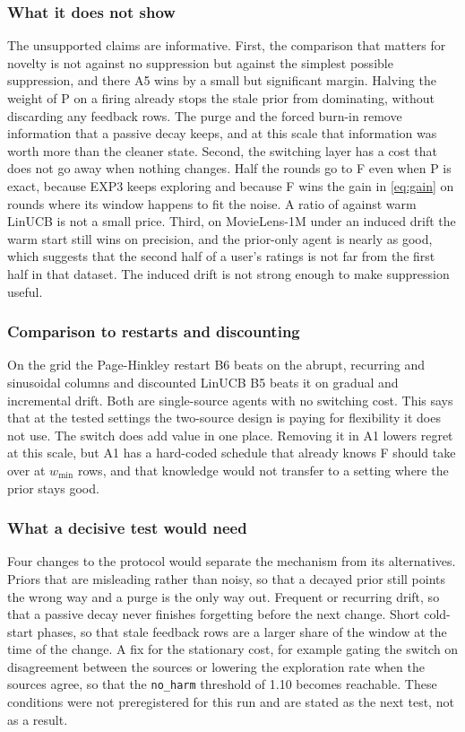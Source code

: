 \subsubsection*{What it does not show}
The unsupported claims are informative. First, the comparison that matters for novelty is not against no suppression but against the simplest possible suppression, and there A5 wins by a small but significant margin. Halving the weight of P on a firing already stops the stale prior from dominating, without discarding any feedback rows. The purge and the forced burn-in remove information that a passive decay keeps, and at this scale that information was worth more than the cleaner state. Second, the switching layer has a cost that does not go away when nothing changes. Half the rounds go to F even when P is exact, because EXP3 keeps exploring and because F wins the gain in \eqref{eq:gain} on rounds where its window happens to fit the noise. A ratio of \harmRatio{} against warm LinUCB is not a small price. Third, on MovieLens-1M under an induced drift the warm start still wins on precision, and the prior-only agent is nearly as good, which suggests that the second half of a user's ratings is not far from the first half in that dataset. The induced drift is not strong enough to make suppression useful.

\subsubsection*{Comparison to restarts and discounting}
On the grid the Page-Hinkley restart B6 beats \des{} on the abrupt, recurring and sinusoidal columns and discounted LinUCB B5 beats it on gradual and incremental drift. Both are single-source agents with no switching cost. This says that at the tested settings the two-source design is paying for flexibility it does not use. The switch does add value in one place. Removing it in A1 lowers regret at this scale, but A1 has a hard-coded schedule that already knows F should take over at $w_{\min}$ rows, and that knowledge would not transfer to a setting where the prior stays good.

\subsubsection*{What a decisive test would need}
Four changes to the protocol would separate the mechanism from its alternatives. Priors that are misleading rather than noisy, so that a decayed prior still points the wrong way and a purge is the only way out. Frequent or recurring drift, so that a passive decay never finishes forgetting before the next change. Short cold-start phases, so that stale feedback rows are a larger share of the window at the time of the change. A fix for the stationary cost, for example gating the switch on disagreement between the sources or lowering the exploration rate when the sources agree, so that the \texttt{no\_harm} threshold of 1.10 becomes reachable. These conditions were not preregistered for this run and are stated as the next test, not as a result.

